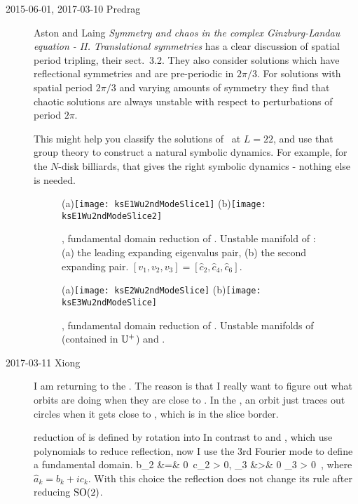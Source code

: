 \begin{description}
\item[2015-06-01, 2017-03-10 Predrag]
Aston and Laing {\em Symmetry and chaos in the
complex {Ginzburg-Landau} equation - II. Translational symmetries}
has a clear discussion of spatial period tripling, their sect.~3.2.
They also consider solutions which have reflectional symmetries and are
pre-periodic in $2\pi/3$.
For solutions with spatial period $2\pi/3$ and varying amounts of symmetry
they find that chaotic solutions are
always unstable with respect to perturbations of period $2\pi$.

This might help you classify the solutions of \KS\ at $L=22$, and use that
group theory to construct a natural symbolic dynamics. For example, for the
$N$-disk billiards, that gives the right symbolic dynamics - nothing else is
needed.

\begin{figure}[h]
  \centering
  (a)\texttt{[image: ksE1Wu2ndModeSlice1]}
  (b)\texttt{[image: ksE1Wu2ndModeSlice2]}
  \caption{
    \SFslice, fundamental domain  reduction of .
    Unstable manifold of :
    (a) the leading expanding eigenvalus pair, (b) the second expanding pair.
    $[v_1, v_2, v_3] = [\hat{c}_2, \hat{c}_4, \hat{c}_6]$.
  }
  \label{fig:ksE1Wu2nd}
\end{figure}
\begin{figure}[h]
  \centering
  (a)\texttt{[image: ksE2Wu2ndModeSlice]}
  (b)\texttt{[image: ksE3Wu2ndModeSlice]}
  \caption{
    \SFslice, fundamental domain  reduction of .
    Unstable manifolds of  (contained in $\mathbb{U}^+$) and .
    }
  \label{fig:ksWuE2E32nd}
\end{figure}


\item[2017-03-11 Xiong]
I am returning to the {\sFslice}. The reason is that I really want to
figure out what orbits are doing when they are close to .
In the {\fFslice}, an orbit just traces out circles when
it gets close to , which is in the slice border.


 {\bf \SFslice} reduction of  is defined by rotation into
In contrast to  and ,
which use polynomials to reduce reflection, now  I use the
3rd Fourier mode to define a fundamental domain.
\bea
b_2 &=& 0 \,\quad c_2 > 0,
    \continue
{}_3 &>& 0\quad {} \quad {}_3 > 0
\,,
\label{XDsFslice1}
\eea
where $\hat{a}_k = b_k+ic_k$. With this choice the reflection
 does not change its rule  after reducing $\textrm{SO}(2)$.


\end{description}
